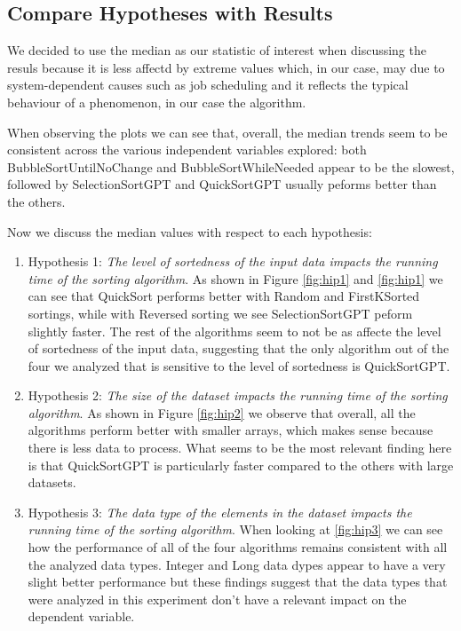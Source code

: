 \documentclass[unicode,11pt,a4paper,oneside,numbers=endperiod,openany]{scrartcl}
\begin{document}
    \subsection{Compare Hypotheses with Results}

    We decided to use the median as our statistic of interest when discussing the resuls because it is less affectd by extreme values which, in our case, may due to system-dependent causes such as job scheduling and it reflects the typical behaviour of a phenomenon, in our case the algorithm.

    When observing the plots we can see that, overall, the median trends seem to be consistent across the various independent variables explored: both BubbleSortUntilNoChange and BubbleSortWhileNeeded appear to be the slowest, followed by SelectionSortGPT and QuickSortGPT usually peforms better than the others. 

    Now we discuss the median values with respect to each hypothesis:

    \begin{enumerate}
        \item Hypothesis 1: \textit{ The level of sortedness of the input data impacts the running time of the sorting algorithm}. As shown in Figure \ref{fig:hip1} and \ref{fig:hip1} we can see that QuickSort performs better with Random and FirstKSorted sortings, while with Reversed sorting we see SelectionSortGPT peform slightly faster. The rest of the algorithms seem to not be as affecte the level of sortedness of the input data, suggesting that the only algorithm out of the four we analyzed that is sensitive to the level of sortedness is QuickSortGPT.

        \item Hypothesis 2: \textit{The size of the dataset impacts the running time of the sorting algorithm}. As shown in Figure \ref{fig:hip2} we observe that overall, all the algorithms perform better with smaller arrays, which makes sense because there is less data to process. What seems to be the most relevant finding here is that QuickSortGPT is particularly faster compared to the others with large datasets.

        \item Hypothesis 3: \textit{The data type of the elements in the dataset impacts the running time of the sorting algorithm}. When looking at \ref{fig:hip3} we can see how the performance of all of the four algorithms remains consistent with all the analyzed data types. Integer and Long data dypes appear to have a very slight better performance but these findings suggest that the data types that were analyzed in this experiment don't have a relevant impact on the dependent variable.
    \end{enumerate}
\end{document}
